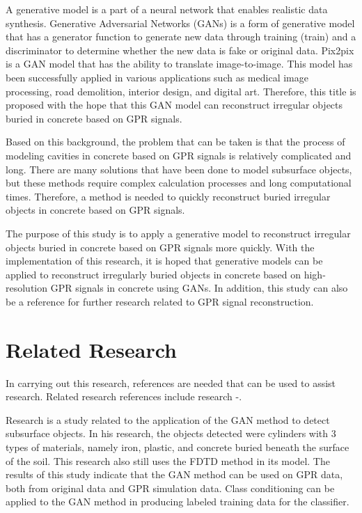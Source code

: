 \documentclass[conference]{IEEEtran}
\begin{document}
A generative model is a part of a neural network that enables realistic data synthesis. 
Generative Adversarial Networks (GANs) is a form of generative model that has a generator function to generate new data through training (train) and a discriminator to determine whether the new data is fake or original data. 
Pix2pix is a GAN model that has the ability to translate image-to-image. 
This model has been successfully applied in various applications such as medical image processing, road demolition, interior design, and digital art. 
Therefore, this title is proposed with the hope that this GAN model can reconstruct irregular objects buried in concrete based on GPR signals.

Based on this background, the problem that can be taken is that the process of modeling cavities in concrete based on GPR signals is relatively complicated and long. 
There are many solutions that have been done to model subsurface objects, but these methods require complex calculation processes and long computational times. 
Therefore, a method is needed to quickly reconstruct buried irregular objects in concrete based on GPR signals.

The purpose of this study is to apply a generative model to reconstruct irregular objects buried in concrete based on GPR signals more quickly. 
With the implementation of this research, it is hoped that generative models can be applied to reconstruct irregularly buried objects in concrete based on high-resolution GPR signals in concrete using GANs. 
In addition, this study can also be a reference for further research related to GPR signal reconstruction.

\section{Related Research}
In carrying out this research, references are needed that can be used to assist research. 
Related research references include research \cite{b1}-\cite{b3}.

Research \cite{b1} is a study related to the application of the GAN method to detect subsurface objects. 
In his research, the objects detected were cylinders with 3 types of materials, namely iron, plastic, and concrete buried beneath the surface of the soil. 
This research also still uses the FDTD method in its model. 
The results of this study indicate that the GAN method can be used on GPR data, both from original data and GPR simulation data. 
Class conditioning can be applied to the GAN method in producing labeled training data for the classifier.
\end{document}
